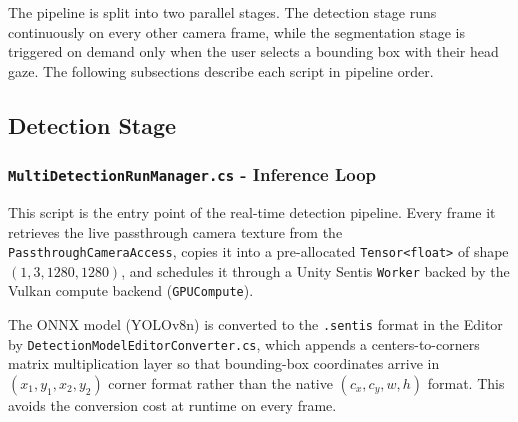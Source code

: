 \documentclass{article}
\begin{document}

The pipeline is split into two parallel stages. The detection stage runs continuously on every other camera frame, while the segmentation stage is triggered on demand only when the user selects a bounding box with their head gaze. The following subsections describe each script in pipeline order.

\subsection{Detection Stage}

\subsubsection{\texttt{MultiDetectionRunManager.cs} - Inference Loop}

This script is the entry point of the real-time detection pipeline. Every frame it retrieves the live passthrough camera texture from the \texttt{PassthroughCameraAccess}, copies it into a pre-allocated \texttt{Tensor<float>} of shape $(1,3,1280,1280)$, and schedules it through a Unity Sentis \texttt{Worker} backed by the Vulkan compute backend (\texttt{GPUCompute}).

The ONNX model (YOLOv8n) is converted to the \texttt{.sentis} format in the Editor by \texttt{DetectionModelEditorConverter.cs}, which appends a centers-to-corners matrix multiplication layer so that bounding-box coordinates arrive in $(x_1, y_1, x_2, y_2)$ corner format rather than the native $(c_x, c_y, w, h)$ format. This avoids the conversion cost at runtime on every frame.
\end{document}
